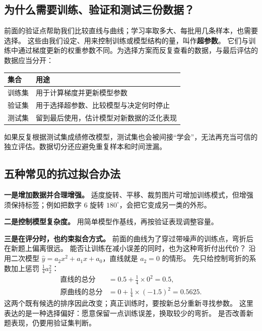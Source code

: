 \subsection{为什么需要训练、验证和测试三份数据？}
\label{concept:training-set}
\label{concept:validation-set}
\label{concept:test-set}

前面的验证点帮助我们比较直线与曲线；学习率取多大、每批用几条样本，也需要选择。
\label{concept:hyperparameter}%
这些由我们设定、用来控制训练或模型结构的量，叫作\textbf{超参数}。
它们与训练中通过梯度更新的权重参数不同。为选择方案而反复查看的数据，与最后评估的数据应当分开：

\begin{center}
\small
{}
\begin{tabularx}{\linewidth}{@{}p{21mm}X@{}}\toprule
集合 & 用途\\\midrule
训练集 & 用于计算梯度并更新模型参数\\
验证集 & 用于选择超参数、比较模型与决定何时停止\\
测试集 & 留到最后使用，估计模型对新数据的泛化表现\\
\bottomrule\end{tabularx}
\end{center}
如果反复根据测试集成绩修改模型，测试集也会被间接“学会”，无法再充当可信的独立评估。数据切分还应避免重复样本和时间泄漏。

\subsection{五种常见的抗过拟合办法}
\label{concept:data-augmentation}
\label{concept:regularization}
\label{concept:early-stopping}

\textbf{一是增加数据并合理增强。}
适度旋转、平移、裁剪图片可增加训练模式，但增强须保持标签；例如把数字 $6$ 旋转 $180^\circ$，会把它变成另一类的外形。

\textbf{二是控制模型复杂度。}
用简单模型作基线，再按验证表现调整容量。

\textbf{三是在评分时，也约束拟合方式。}
前面的曲线为了穿过带噪声的训练点，弯折后在新题上偏离很远。
能否让训练在减小误差的同时，也为这种弯折付出代价？
沿用二次模型 $\widehat{y}=a_2x^2+a_1x+a_0$，直线就是 $a_2=0$ 的情形。
先只给控制弯折的系数加上惩罚 $\tfrac14a_2^2$：
\[
\begin{aligned}
\text{直线的总分}&=0.5+\tfrac14\times0^2=0.5,\\
\text{原曲线的总分}&=0+\tfrac14\times(-1.5)^2=0.5625.
\end{aligned}
\]
这两个既有候选的排序因此改变；真正训练时，要按新总分重新寻找参数。
这里表达的是一种选择偏好：愿意保留一点训练误差，换取较少的弯折。
是否改善新题表现，仍要用验证集判断。

